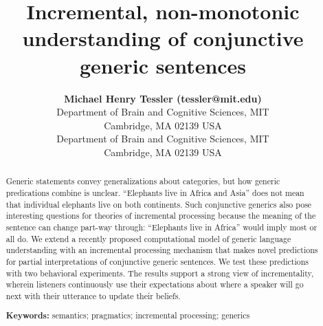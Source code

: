 \documentclass[10pt,letterpaper]{article}
\title{Incremental, non-monotonic understanding of conjunctive generic sentences}
\author{{\large \bf Michael Henry Tessler (tessler@mit.edu)} \\
  Department of Brain and Cognitive Sciences, MIT \\
  Cambridge, MA 02139 USA
  \AND {\large \bf Roger Levy (rplevy@mit.edu)} \\
  Department of Brain and Cognitive Sciences, MIT \\
  Cambridge, MA 02139 USA}
\begin{document}
\maketitle


\begin{abstract}


Generic statements convey generalizations about categories, but how generic predications combine is unclear.
``Elephants live in Africa and Asia'' does not mean that individual elephants live on both continents.
Such conjunctive generics %
also pose interesting questions for theories of incremental processing because the meaning of the sentence can change part-way through: ``Elephants live in Africa'' would imply most or all do. 
We extend a recently proposed computational model of generic language understanding with an incremental processing mechanism that makes novel predictions for partial interpretations of conjunctive generic sentences.
We test these predictions with two behavioral experiments. 
The results support a strong view of incrementality, wherein listeners  continuously use their expectations about where a speaker will go next with their utterance to update their beliefs.



\textbf{Keywords:} 
semantics; pragmatics; incremental processing; generics
\end{abstract}
\end{document}

